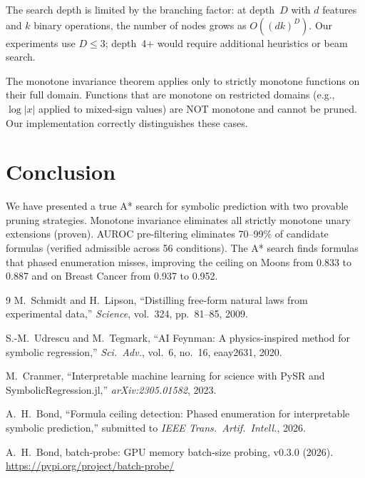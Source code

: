 \documentclass[journal]{IEEEtran}
\begin{document}
The search depth is limited by the branching factor: at depth~$D$
with $d$ features and $k$ binary operations, the number of nodes
grows as $O((dk)^D)$. Our experiments use $D \leq 3$; depth~4+
would require additional heuristics or beam search.

The monotone invariance theorem applies only to strictly monotone
functions on their full domain. Functions that are monotone on
restricted domains (e.g., $\log|x|$ applied to mixed-sign values)
are NOT monotone and cannot be pruned. Our implementation correctly
distinguishes these cases.

\section{Conclusion}

We have presented a true A* search for symbolic prediction with
two provable pruning strategies. Monotone invariance eliminates
all strictly monotone unary extensions (proven). AUROC pre-filtering
eliminates 70--99\% of candidate formulas (verified admissible
across 56 conditions). The A* search finds formulas that phased
enumeration misses, improving the ceiling on Moons from 0.833 to
0.887 and on Breast Cancer from 0.937 to 0.952.

\begin{thebibliography}{9}
M.~Schmidt and H.~Lipson, ``Distilling free-form natural laws from
experimental data,'' \emph{Science}, vol.~324, pp.~81--85, 2009.

S.-M.~Udrescu and M.~Tegmark, ``AI Feynman: A physics-inspired
method for symbolic regression,'' \emph{Sci.\ Adv.}, vol.~6,
no.~16, eaay2631, 2020.

M.~Cranmer, ``Interpretable machine learning for science with PySR
and SymbolicRegression.jl,'' \emph{arXiv:2305.01582}, 2023.

A.~H.~Bond, ``Formula ceiling detection: Phased enumeration for
interpretable symbolic prediction,'' submitted to \emph{IEEE Trans.\
Artif.\ Intell.}, 2026.

A.~H.~Bond, batch-probe: GPU memory batch-size probing, v0.3.0
(2026). \url{https://pypi.org/project/batch-probe/}
\end{thebibliography}
\end{document}
